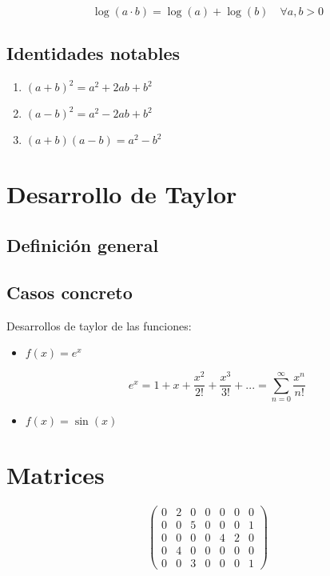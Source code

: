 \documentclass{article}
\begin{document}
\begin{equation}\log(a·b)=\log(a)+\log(b)\quad \forall a,b > 0\end{equation}

\subsection{Identidades notables}

\begin{enumerate}
\item $ \left(a+b\right)^2 = a^2 + 2ab + b^2 $
\item $ \left(a-b\right)^2 = a^2 - 2ab + b^2 $
\item $ \left(a+b\right)\left(a-b\right) = a^2-b^2 $
\end{enumerate}

\section{Desarrollo de Taylor}

\subsection{Definici\'on general}


\subsection{Casos concreto}

Desarrollos de taylor de las funciones:

\begin{itemize}
\item $f(x)=e^x$

\[ e^x = 1 + x + \frac{x^2}{2!} + \frac{x^3}{3!} + ... = \sum_{n=0}^\infty\frac{x^n}{n!}\]

\item $f(x) = \sin (x)$


\end{itemize}

\section{Matrices}
\[ \begin{pmatrix}
   0 & 2 & 0 & 0 & 0 & 0 & 0 \\
   0 & 0 & 5 & 0 & 0 & 0 & 1 \\
   0 & 0 & 0 & 0 & 4 & 2 & 0 \\
   0 & 4 & 0 & 0 & 0 & 0 & 0 \\
   0 & 0 & 3 & 0 & 0 & 0 & 1
\end{pmatrix} \]
\end{document}
